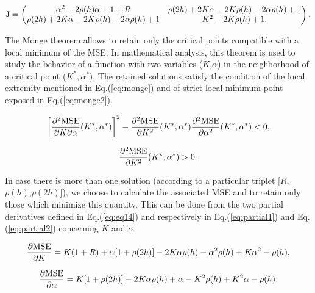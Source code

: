 \documentclass[preprint,12pt,3p]{elsarticle}
\begin{document}
\begin{equation}
\label{eq:eqJ}
\textnormal{J}=
 \begin{pmatrix} \alpha^2-2\rho(h)\alpha+1+R & \rho(2h) + 2K\alpha - 2K\rho(h) - 2\alpha\rho(h) + 1 \\ \rho(2h) + 2K\alpha - 2K\rho(h) - 2\alpha\rho(h) + 1 & K^2-2K\rho(h)+1. 
 \end{pmatrix}.
\end{equation}


The Monge theorem allows to retain only the critical points compatible with a local minimum of the MSE. In mathematical analysis, this theorem is used to study the behavior of a function with two variables ($K$,$\alpha$) in the neighborhood of a critical point ($K^*,\alpha ^*$). The retained solutions satisfy the condition of the local extremity mentioned in Eq.(\ref{eq:monge}) and of strict local minimum point exposed in Eq.(\ref{eq:monge2}).

\begin{equation}
\label{eq:monge}
\left[\frac{\partial^2 \textnormal{MSE}}{\partial K \partial \alpha}(K^*,\alpha^*)\right]^2-\frac{\partial^2 \textnormal{MSE}}{\partial K^2 }(K^*,\alpha^*)\frac{\partial^2 \textnormal{MSE}}{\partial \alpha^2 }(K^*,\alpha^*)<0,
\end{equation}

\begin{equation}
\label{eq:monge2}
\frac{\partial^2 \textnormal{MSE}}{\partial K^2 }(K^*,\alpha^*)>0.
\end{equation}

In case there is more than one solution (according to a particular triplet [$R$,$\rho(h)$,$\rho(2h)$]), we choose to calculate the associated MSE and to retain only those which minimize this quantity. This can be done from the two partial derivatives defined in Eq.(\ref{eq:eq14}) and respectively in Eq.(\ref{eq:partial1}) and Eq.(\ref{eq:partial2}) concerning $K$  and $\alpha$.

\begin{equation}
\label{eq:partial1}
\frac{\partial \textnormal{MSE}}{\partial K}=K(1+R)+\alpha[1+\rho(2h)]-2K\alpha\rho(h)-\alpha^2\rho(h)+K\alpha^2-\rho(h),
\end{equation}

\begin{equation}
\label{eq:partial2}
\frac{\partial \textnormal{MSE}}{\partial \alpha}=K[1+\rho(2h)]-2K\alpha\rho(h)+\alpha-K^2\rho(h)+K^2\alpha-\rho(h).
\end{equation}
\end{document}
